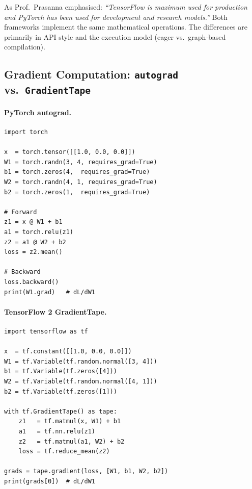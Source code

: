 \documentclass[12pt,a4paper]{article}
\begin{document}
\begin{keyinsight}
As Prof.\ Prasanna emphasised: \textit{``TensorFlow is maximum used for
production and PyTorch has been used for development and research
models.''  }Both frameworks implement the same mathematical operations.
The differences are primarily in API style and the execution model
(eager vs.\ graph-based compilation).
\end{keyinsight}

\subsection{Gradient Computation: \texttt{autograd} vs.\ \texttt{GradientTape}}
\label{ssec:grad_compute}

\paragraph{PyTorch autograd.}
\begin{verbatim}
import torch

x  = torch.tensor([[1.0, 0.0, 0.0]])
W1 = torch.randn(3, 4, requires_grad=True)
b1 = torch.zeros(4,  requires_grad=True)
W2 = torch.randn(4, 1, requires_grad=True)
b2 = torch.zeros(1,  requires_grad=True)

# Forward
z1 = x @ W1 + b1
a1 = torch.relu(z1)
z2 = a1 @ W2 + b2
loss = z2.mean()

# Backward
loss.backward()
print(W1.grad)   # dL/dW1
\end{verbatim}

\paragraph{TensorFlow 2 GradientTape.}
\begin{verbatim}
import tensorflow as tf

x  = tf.constant([[1.0, 0.0, 0.0]])
W1 = tf.Variable(tf.random.normal([3, 4]))
b1 = tf.Variable(tf.zeros([4]))
W2 = tf.Variable(tf.random.normal([4, 1]))
b2 = tf.Variable(tf.zeros([1]))

with tf.GradientTape() as tape:
    z1   = tf.matmul(x, W1) + b1
    a1   = tf.nn.relu(z1)
    z2   = tf.matmul(a1, W2) + b2
    loss = tf.reduce_mean(z2)

grads = tape.gradient(loss, [W1, b1, W2, b2])
print(grads[0])  # dL/dW1
\end{verbatim}
\end{document}
